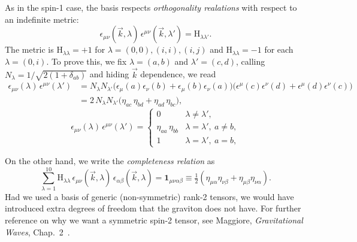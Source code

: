 \documentclass[12pt,a4paper,oneside]{article}
\numberwithin{equation}{section}   %
\begin{document}
As in the spin-1 case, the basis respects \textit{orthogonality 
realations} with respect to an indefinite
metric:
\begin{equation}
  \epsilon_{\mu\nu}(\vec{k},\lambda)\,
  \epsilon^{\mu\nu}(\vec{k},\lambda')=\mathrm{H}_{\lambda\lambda'}.
  \label{eq:orthonormality}
\end{equation}
The metric is $\mathrm{H}_{\lambda\lambda}=+1$ for
$\lambda=(0,0),(i,i),(i,j)$ and $\mathrm{H}_{\lambda\lambda}=-1$ for each
$\lambda=(0,i)$.
To prove this, we fix $\lambda=(a,b)$ and $\lambda'=(c,d)$, calling
 $N_\lambda=1/\sqrt{2(1+\delta_{ab})}$ and hiding
$\vec k$ dependence, we read
\begin{align}
\epsilon_{\mu\nu}(\lambda)\,\epsilon^{\mu\nu}(\lambda')
&=N_\lambda N_{\lambda'}
\bigl(\epsilon_{\mu}(a)\epsilon_{\nu}(b)+\epsilon_{\mu}(b)\epsilon_{\nu}(a)\bigr)
\bigl(\epsilon^{\mu}(c)\epsilon^{\nu}(d)+\epsilon^{\mu}(d)\epsilon^{\nu}(c)\bigr)\nonumber\\
&=2\,N_\lambda N_{\lambda'}\bigl(\eta_{ac}\,\eta_{bd}+\eta_{ad}\,\eta_{bc}\bigr),
\end{align}
\begin{equation}
\epsilon_{\mu\nu}(\lambda)\,\epsilon^{\mu\nu}(\lambda') =
\begin{cases}
0 & \lambda\neq\lambda', \\[2pt]
\eta_{aa}\,\eta_{bb} & \lambda=\lambda',\ a\neq b, \\[2pt]
1 & \lambda=\lambda',\ a=b,
\end{cases}
\tag*{$\Box$}
\end{equation}

On the other hand, we write the
\textit{completeness relation} as
\begin{equation}
  \sum_{\lambda=1}^{10}\mathrm{H}_{\lambda\lambda}\,
  \epsilon_{\mu\nu}(\vec{k},\lambda)\,\epsilon_{\alpha\beta}(\vec{k},\lambda)
  = \mathbf{1}_{\mu\nu\alpha\beta}
  \equiv\tfrac12\left(\eta_{\mu\alpha}\eta_{\nu\beta}+\eta_{\mu\beta}\eta_{\nu\alpha}\right).
\label{eq:completeness-dewitt}
\end{equation}
Had we used a basis of generic (non-symmetric) rank-2 tensors, we would have
introduced extra degrees of freedom that the graviton does not have. For
further reference on why we want a symmetric spin-2 tensor, see Maggiore,
\textit{Gravitational Waves}, Chap.~2~\cite{Maggiore2008}.
\end{document}
